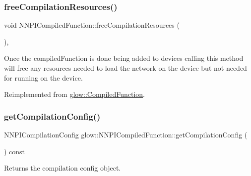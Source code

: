 \subsubsection{\texorpdfstring{free\+Compilation\+Resources()}{freeCompilationResources()}}
{\footnotesize\ttfamily void N\+N\+P\+I\+Compiled\+Function\+::free\+Compilation\+Resources (\begin{DoxyParamCaption}{ }\end{DoxyParamCaption})\hspace{0.3cm}{\ttfamily [override]}, {\ttfamily [virtual]}}

Once the compiled\+Function is done being added to devices calling this method will free any resources needed to load the network on the device but not needed for running on the device. 

Reimplemented from \hyperlink{classglow_1_1_compiled_function_a0bd30fa8ff4f317ac14ae1c02898ed1a}{glow\+::\+Compiled\+Function}.

\mbox{\label{classglow_1_1_n_n_p_i_compiled_function_acb34aada4b36762ecd9bb6ffe5527bd1}} 
\subsubsection{\texorpdfstring{get\+Compilation\+Config()}{getCompilationConfig()}}
{\footnotesize\ttfamily N\+N\+P\+I\+Compilation\+Config glow\+::\+N\+N\+P\+I\+Compiled\+Function\+::get\+Compilation\+Config (\begin{DoxyParamCaption}{ }\end{DoxyParamCaption}) const\hspace{0.3cm}{\ttfamily [inline]}}

\begin{DoxyReturn}{Returns}
the compilation config object. 
\end{DoxyReturn}
\mbox{\label{classglow_1_1_n_n_p_i_compiled_function_a389e936aa03cbbed8241a5d2b6477923}} 
